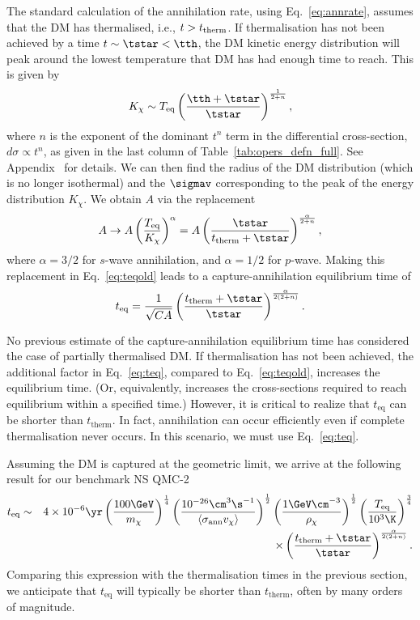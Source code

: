 The standard calculation of the annihilation rate, using Eq.~\ref{eq:annrate}, assumes that the DM has thermalised, i.e., $t > t_{\rm therm}$. 
If thermalisation has not been achieved by a time $t\sim\tstar<\tth$, the DM kinetic energy distribution will peak around the lowest temperature that DM has had enough time to reach. This is given by 
%
\begin{equation}
K_\chi \sim T_{\rm eq} \left(\frac{\tth+\tstar}{\tstar}\right)^{\frac{1}{2+n}},
\label{eq:lowtemp}
\end{equation}
%
where $n$ is the exponent of the dominant $t^n$ term in the differential cross-section, $d\sigma \propto t^n$, as given in the last column of Table~\ref{tab:opers_defn_full}. See Appendix~ for details. 
We can then find the radius of the DM distribution (which is no longer isothermal) and the $\sigmav$ corresponding to the peak of the energy distribution $K_\chi$. 
We obtain $A$ via the replacement  
%
\begin{equation}
    A \rightarrow A \left(\frac{T_\text{eq}}{K_\chi}\right)^{\alpha} = 
   A \left(\frac{\tstar}{t_\text{therm}+\tstar}\right)^{\frac{\alpha}{2+n}},  
\end{equation}
%
where $\alpha=3/2$ for $s$-wave annihilation, and $\alpha=1/2$ for $p$-wave. 
Making this replacement in Eq.~\ref{eq:teqold} leads to a capture-annihilation equilibrium time of
\begin{equation}
 t_{\rm eq} = \frac{1}{\sqrt{C A}} \left(\frac{t_\text{therm}+\tstar}{\tstar}\right)^{\frac{\alpha}{2(2+n)}}. \label{eq:teq} 
\end{equation}

No previous estimate of the capture-annihilation equilibrium time has considered the case of partially thermalised DM. If thermalisation has not been achieved, the additional factor in Eq.~\ref{eq:teq}, compared to Eq.~\ref{eq:teqold}, increases the equilibrium time. (Or, equivalently, increases the cross-sections required to reach equilibrium within a specified time.) However, it is critical to realize that $t_\text{eq}$ can be shorter than $t_\text{therm}$. 
In fact, annihilation can occur efficiently even if complete thermalisation never occurs. In this scenario, we must use Eq.~\ref{eq:teq}.



Assuming the DM is captured at the geometric limit, we arrive at the following result for our benchmark NS QMC-2
\begin{eqnarray}
    t_{\rm eq}  &\sim&  4\times10^{-6}\yr\left(\frac{100\GeV}{m_\chi}\right)^{\frac{1}{4}}\left(\frac{10^{-26}\cm^3 \s^{-1}}{\langle\sigma_\text{ann} v_\chi\rangle}\right)^{\frac{1}{2}} \left(\frac{1\GeV\cm^{-3}}{\rho_\chi}\right)^{\frac{1}{2}}\left(\frac{T_{\rm eq}}{10^3\K}\right)^{\frac{3}{4}} 
    \nonumber \\ &&\times
    \left(\frac{t_{\rm therm}+\tstar}{\tstar}\right)^{\frac{\alpha}{2(2+n)}}.
\end{eqnarray}
Comparing this expression with the thermalisation times in the previous section, we anticipate that  $t_\text{eq}$ will typically be shorter than $t_\text{therm}$, often by many orders of magnitude.




